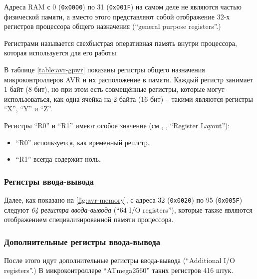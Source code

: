 \documentclass[../sparc.tex]{subfiles}
\begin{document}
Адреса \gls{RAM} с 0 (\texttt{0x0000}) по 31 (\texttt{0x001F})
на самом деле не являются частью физической памяти, а вместо этого представляют
собой отображение 32-х регистров процессора общего назначения (``general purpose
registers''.)

Регистрами называется свехбыстрая оперативная память внутри процессора, которая
используется для его работы.

В таблице \ref{table:avr-gpwr} показаны регистры общего назначения
микроконтроллеров AVR и их расположение в памяти.  Каждый регистр занимает 1
байт (8 бит), но при этом есть совмещённые регистры, которые могут
использоваться, как одна ячейка на 2 байта (16 бит) -- такими являются регистры
``X'', ``Y'' и ``Z''.

Регистры ``R0'' и ``R1'' имеют особое значение (см \cite{avr:gcc}, , ``Register
Layout''):
\begin{itemize}
\item ``R0'' используется, как временный регистр.
\item ``R1'' всегда содержит ноль.
\end{itemize}

\subsubsection{Регистры ввода-вывода}

Далее, как показано на \ref{fig:avr-memory}, с адреса 32
(\texttt{0x0020}) по 95 (\texttt{0x005F}) следуют \emph{64
регистра ввода-вывода} (``64 I/O registers''), которые также являются
отображением специализированной памяти процессора.

\subsubsection{Дополнительные регистры ввода-вывода}

После этого идут дополнительные регистры ввода-вывода (``Additional I/O
registers''.)  В микроконтроллере ``ATmega2560'' таких регистров 416
штук.\cite[22]{avr:atmega2560-datasheet}
\end{document}
